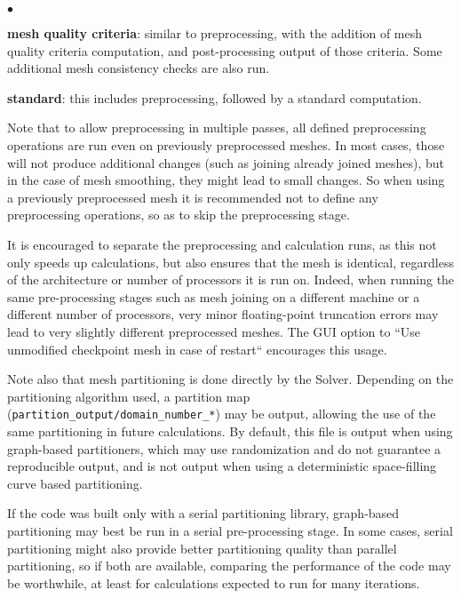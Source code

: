 {{{{{\begin{list}{$\bullet$}{}
\item {\bf mesh quality criteria}: similar to preprocessing, with the addition of mesh quality criteria computation, and post-processing output of those criteria. Some additional mesh consistency checks are also run.

\item {\bf standard}: this includes preprocessing, followed by a standard computation.

\end{list}

Note that to allow preprocessing in multiple passes, all defined preprocessing operations are run even on previously preprocessed meshes. In most cases, those will not produce additional changes (such as joining already joined meshes), but in the case of mesh smoothing, they might lead to small changes. So when using a previously preprocessed mesh it is recommended
not to define any preprocessing operations, so as to skip the preprocessing stage.

It is encouraged to separate the preprocessing and calculation runs, as
this not only speeds up calculations, but also ensures that the mesh is identical, regardless of the architecture or number of processors it is run on. Indeed, when running the same pre-processing stages such as mesh joining on a different machine or a different number of processors, very minor floating-point truncation errors may lead to very slightly different preprocessed meshes.
The GUI option to ``Use unmodified checkpoint mesh in case of restart`` encourages this usage.

Note also that mesh partitioning is done directly by the Solver.
Depending on the partitioning algorithm used, a partition map
(\texttt{partition\_output/domain\_number\_*}) may be output,
allowing the use of the same partitioning in future calculations.
By default, this file is output when using graph-based partitioners, which may
use randomization and do not guarantee a reproducible output, and is not output
when using a deterministic space-filling curve based partitioning.

If the code was built only with a serial partitioning library,
graph-based partitioning may best be run in a serial pre-processing stage.
In some cases, serial partitioning might also provide better partitioning
quality than parallel partitioning, so if both are available, comparing
the performance of the code may be worthwhile, at least for calculations
expected to run for many iterations.

}}}}}
